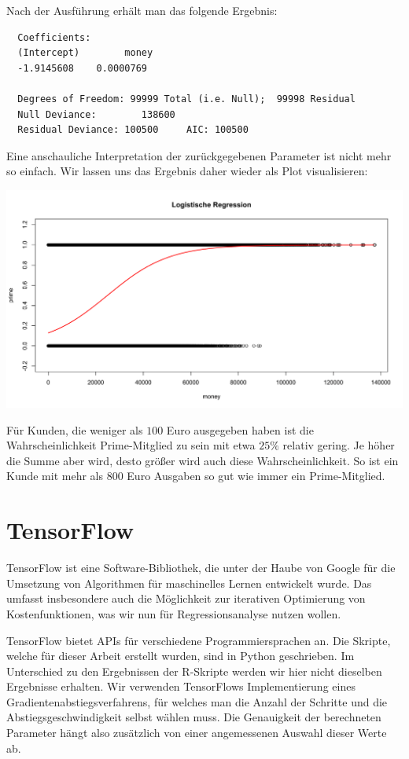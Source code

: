 Nach der Ausführung erhält man das folgende Ergebnis:

\begin{lstlisting}
  Coefficients:
  (Intercept)        money
  -1.9145608    0.0000769

  Degrees of Freedom: 99999 Total (i.e. Null);  99998 Residual
  Null Deviance:	    138600
  Residual Deviance: 100500 	AIC: 100500
\end{lstlisting}

Eine anschauliche Interpretation der zurückgegebenen Parameter ist nicht mehr so einfach. Wir lassen uns das Ergebnis daher wieder als Plot visualisieren:

\includegraphics[width=\textwidth]{r-logisticRegression}

Für Kunden, die weniger als $100$ Euro ausgegeben haben ist die Wahrscheinlichkeit Prime-Mitglied zu sein mit etwa $25\%$ relativ gering. Je höher die Summe aber wird, desto größer wird auch diese Wahrscheinlichkeit. So ist ein Kunde mit mehr als $800$ Euro Ausgaben so gut wie immer ein Prime-Mitglied.

\section{TensorFlow}

TensorFlow ist eine Software-Bibliothek, die unter der Haube von Google für die Umsetzung von Algorithmen für maschinelles Lernen entwickelt wurde. Das umfasst insbesondere auch die Möglichkeit zur iterativen Optimierung von Kostenfunktionen, was wir nun für Regressionsanalyse nutzen wollen.

TensorFlow bietet APIs für verschiedene Programmiersprachen an. Die Skripte, welche für dieser Arbeit erstellt wurden, sind in Python geschrieben. Im Unterschied zu den Ergebnissen der R-Skripte werden wir hier nicht dieselben Ergebnisse erhalten. Wir verwenden TensorFlows Implementierung eines Gradientenabstiegsverfahrens, für welches man die Anzahl der Schritte und die Abstiegsgeschwindigkeit selbst wählen muss. Die Genauigkeit der berechneten Parameter hängt also zusätzlich von einer angemessenen Auswahl dieser Werte ab.

